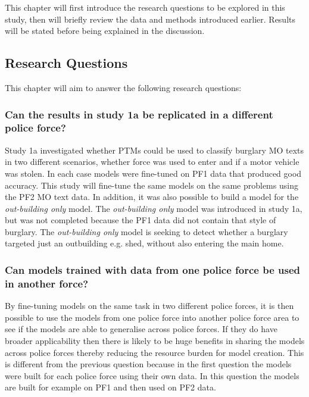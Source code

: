 This chapter will first introduce the research questions to be explored in this study, then will briefly review the data and methods introduced earlier. Results will be stated before being explained in the discussion.


\subsection{Research Questions} This chapter will aim to answer the following research questions:


\subsubsection{Can the results in study 1a be replicated in a different police force?} Study 1a investigated whether PTMs could be used to classify burglary MO texts in two different scenarios, whether force was used to enter and if a motor vehicle was stolen. In each case models were fine-tuned on PF1 data that produced good accuracy. This study will fine-tune the same models on the same problems using the PF2 MO text data.  In addition, it was also possible to build a model for the \emph{out-building only} model. The \emph{out-building only} model was introduced in study 1a, but was not completed because the PF1 data did not contain that style of burglary. The \emph{out-building only} model is seeking to detect whether a burglary targeted just an outbuilding e.g. shed, without also entering the main home.

\subsubsection{Can models trained with data from one police force be used in another force?} By fine-tuning models on the same task in two different police forces, it is then possible to use the models from one police force into another police force area to see if the models are able to generalise across police forces. If they do have broader applicability then there is likely to be huge benefits in sharing the models across police forces thereby reducing the resource burden for model creation. This is different from the previous question because in the first question the models were built for each police force using their own data. In this question the models are built for example on PF1 and then used on PF2 data.


